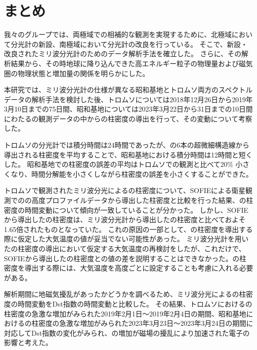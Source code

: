 \chapter{まとめ}
我々のグループでは、両極域での相補的な観測を実現するために、北極域において分光計の新設、南極域において分光計の改良を行っている。
そこで、新設・改良されたミリ波分光計のためのデータ解析手法を確立した。
さらに、その解析結果から、その時地球に降り込んできた高エネルギー粒子の物理量および磁気圏の物理状態と増加量の関係を明らかにした。\par

本研究では、ミリ波分光計の仕様が異なる昭和基地とトロムソ両方のスペクトルデータの解析手法を検討した後、トロムソについては2018年12月26日から2019年3月10日までの75日間、昭和基地については2023年3月22日から31日までの10日間にわたるの観測データの中からの柱密度の導出を行って、その変動について考察した。\par

トロムソの分光計では積分時間は24時間であったが、の6本の超微細構造線から導出される柱密度を平均することで、昭和基地における積分時間は12時間と短くした。
昭和基地での柱密度の誤差の平均はトロムソでの観測と比べて20\% 小さくなり、時間分解能を小さくしながら柱密度の誤差を小さくすることができた。\par

トロムソで観測されたミリ波分光によるの柱密度について、SOFIEによる衛星観測でのの高度プロファイルデータから導出した柱密度と比較を行った結果、の柱密度の時間変動について傾向が一致していることが分かった。
しかし、SOFIEから導出したの柱密度は、ミリ波分光計から導出したの柱密度と比べておよそ1.65倍されたものとなっていた。
これの原因の一部として、の柱密度を導出する際に仮定した大気温度の値が妥当でない可能性があった。
ミリ波分光計を用いたの柱密度の導出において仮定する大気温度の再検討をしたが、これだけで、SOFIEから導出したの柱密度との値の差を説明することはできなかった。の柱密度を導出する際には、大気温度を高度ごとに設定することも考慮に入れる必要がある。\par

解析期間に地磁気擾乱があったかどうかを調べるため、ミリ波分光によるの柱密度の時間変動をDst指数の時間変動と比較した。
その結果、トロムソにおけるの柱密度の急激な増加がみられた2019年2月1日～2019年2月4日の期間、昭和基地におけるの柱密度の急激な増加がみられた2023年3月23日〜2023年3月24日の期間に対応してDst指数の変化がみられ、の増加が磁場の擾乱により加速された電子の影響と考えた。\par

